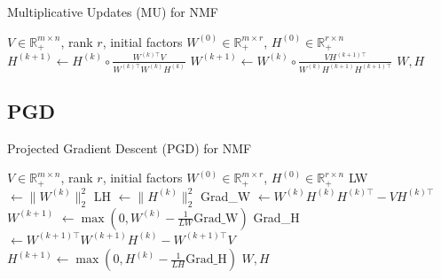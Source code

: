 \documentclass{beamer}
\newcommand{\R}{\mathbb{R}}
\begin{document}
\begin{frame}{Multiplicative Updates (MU) for NMF}
  \begin{block}{}
  \begin{algorithm}[H]
    \caption{Multiplicative Update for NMF}
    \label{MU}
    \begin{algorithmic}
        \Require \( V \in \mathbb{R}_+^{m \times n} \), rank \( r \), initial factors \( W^{(0)} \in \mathbb{R}_+^{m \times r} \), \( H^{(0)} \in \mathbb{R}_+^{r \times n} \)
            \State \( H^{(k+1)} \leftarrow H^{(k)} \circ \frac{W^{(k) \top} V}{W^{(k) \top} W^{(k)} H^{(k)}} \)
            \State \( W^{(k+1)} \leftarrow W^{(k)} \circ \frac{V H^{(k+1) \top}}{W^{(k)} H^{(k+1)} H^{(k+1) \top}} \)
            \EndWhile
        \State \Return \( W, H \)
    \end{algorithmic}
\end{algorithm}
\end{block}
\end{frame}

\subsection{PGD}

\begin{frame}{Projected Gradient Descent (PGD) for NMF}
  \begin{block}{}
  \begin{algorithm}[H]
    \caption{Projected Gradient Descent for NMF}
    \label{Projected Gradient}
    \begin{algorithmic}[1] 
        \Require \( V \in \mathbb{R}_+^{m \times n} \), rank \( r \), initial factors \( W^{(0)} \in \mathbb{R}_+^{m \times r} \), \( H^{(0)} \in \mathbb{R}_+^{r \times n} \)
            \State LW \( \leftarrow \|W^{(k)}\|_2^2 \)
            \State LH \( \leftarrow \|H^{(k)}\|_2^2 \)
            \State Grad\_W \( \leftarrow W^{(k)} H^{(k)} H^{(k) \top} - V H^{(k) \top} \)
            \State $W^{(k+1)}$ \( \leftarrow \max\left(0, W^{(k)} - \frac{1}{LW} \text{Grad\_W} \right) \)
            \State Grad\_H \( \leftarrow W^{(k+1) \top} W^{(k+1)} H^{(k)} - W^{(k+1) \top} V \)
            \State $H^{(k+1)} \leftarrow \max\left(0, H^{(k)} - \frac{1}{LH} \text{Grad\_H} \right)$
        \EndWhile
        \State \Return \( W, H \)
    \end{algorithmic}
\end{algorithm}
\end{block}  
\end{frame}
\end{document}
